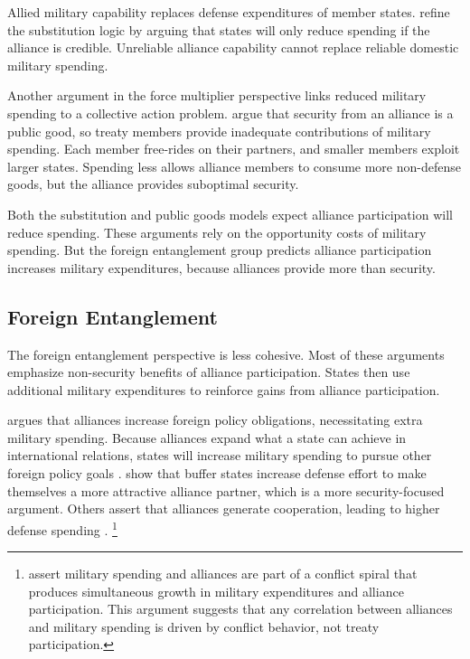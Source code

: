 \documentclass[12pt]{article}
\begin{document}
Allied military capability replaces defense expenditures of member states. 
\citet{DigiuseppePoast2016} refine the substitution logic by arguing that states will only reduce spending if the alliance is credible. 
Unreliable alliance capability cannot replace reliable domestic military spending. 


Another argument in the force multiplier perspective links reduced military spending to a collective action problem. 
\citet{OlsonZeckhauser1966} argue that security from an alliance is a public good, so treaty members provide inadequate contributions of military spending. 
Each member free-rides on their partners, and smaller members exploit larger states. 
Spending less allows alliance members to consume more non-defense goods, but the alliance provides suboptimal security. 


Both the substitution and public goods models expect alliance participation will reduce spending. 
These arguments rely on the opportunity costs of military spending. 
But the foreign entanglement group predicts alliance participation increases military expenditures, because alliances provide more than security. 


\subsection{Foreign Entanglement}


The foreign entanglement perspective is less cohesive.
Most of these arguments emphasize non-security benefits of alliance participation. 
States then use additional military expenditures to reinforce gains from alliance participation. 


\citet{Diehl1994} argues that alliances increase foreign policy obligations, necessitating extra military spending. 
Because alliances expand what a state can achieve in international relations, states will increase military spending to pursue other foreign policy goals \citep{MorganPalmer2006}. 
\citet{Horowitzetal2017} show that buffer states increase defense effort to make themselves a more attractive alliance partner, which is a more security-focused argument. 
Others assert that alliances generate cooperation, leading to higher defense spending \citep{Palmer1990, QuirozFlores2011}.
\footnote{\citet{SeneseVasquez2008} assert military spending and alliances are part of a conflict spiral that produces simultaneous growth in military expenditures and alliance participation. 
This argument suggests that any correlation between alliances and military spending is driven by conflict behavior, not treaty participation.
}
\end{document}

